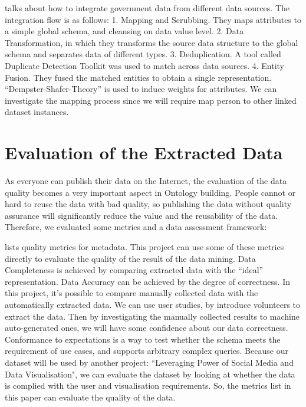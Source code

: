 \cite{bohm2010} talks about how to integrate government data from different data sources. The integration flow is as follows: 1. Mapping and Scrubbing. They maps attributes to a simple global schema, and cleansing on data value level. 2. Data Transformation, in which they transforms the source data structure to the global schema and separates data of different types. 3. Deduplication. A tool called Duplicate Detection Toolkit was used to match across data sources. 4. Entity Fusion. They fused the matched entities to obtain a single representation. ``Dempster-Shafer-Theory'' is used to induce weights for attributes. We can investigate the mapping process since we will require map person to other linked dataset instances.

\section{Evaluation of the Extracted Data}

As everyone can publish their data on the Internet, the evaluation of the data quality becomes a very important aspect in Ontology building. People cannot or hard to reuse the data with bad quality, so publishing the data without quality assurance will significantly reduce the value and the reusability of the data. Therefore, we evaluated some metrics and a data assessment framework:

\cite{ochoa2006} lists quality metrics for metadata. This project can use some of these metrics directly to evaluate the quality of the result of the data mining. Data Completeness is achieved by comparing extracted data with the ``ideal'' representation. Data Accuracy can be achieved by the degree of correctness. In this project, it's possible to compare manually collected data with the automatically extracted data. We can use user studies, by introduce volunteers to extract the data. Then by investigating the manually collected results to machine auto-generated ones, we will have some confidence about our data correctness. Conformance to expectations is a way to test whether the schema meets the requirement of use cases, and supports arbitrary complex queries. Because our dataset will be used by another project: ``Leveraging Power of Social Media and Data Visualisation", we can evaluate the dataset by looking at whether the data is complied with the user and visualisation requirements. So, the metrics list in this paper can evaluate the quality of the data.

